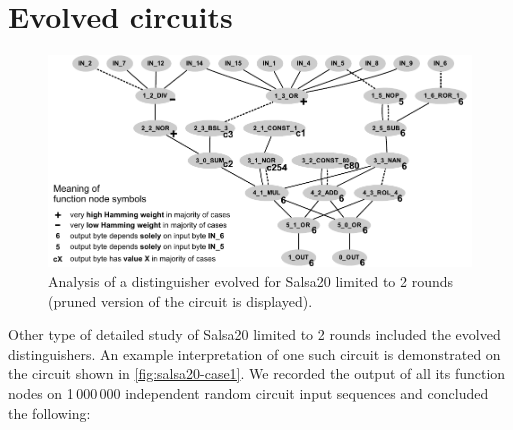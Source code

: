 \documentclass[12pt,oneside]{fithesis2}		%
\renewcommand{\_}{\leavevmode \kern0.0em\vbox{\hrule width0.4em}}
\begin{document}
\section{Evolved circuits}
\label{sec:salsa-circuits}

\begin{figure}[t!]
\centering
\includegraphics[width=\textwidth]{images/case1-final}
\caption{Analysis of a distinguisher evolved for Salsa20 limited to 2 rounds (pruned version of the circuit is displayed).}
\label{fig:salsa20-case1}
\end{figure}

Other type of detailed study of Salsa20 limited to 2 rounds included the evolved distinguishers.
An example interpretation of one such circuit is demonstrated on the circuit shown in \autoref{fig:salsa20-case1}.
We recorded the output of all its function nodes on 1\,000\,000 independent random circuit input sequences and concluded the following:
\end{document}
